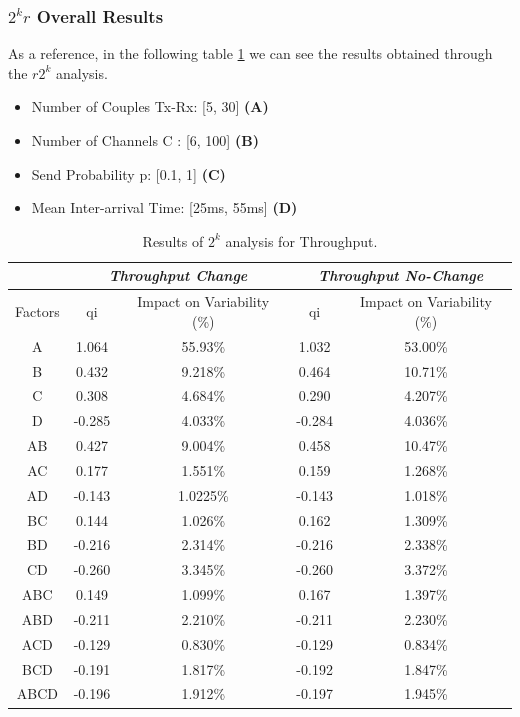\subsubsection{$2^kr$ Overall Results}
As a reference, in the following table \ref{tab: 2kr_results_explosion} we can see the results obtained through the $r2^k$ analysis.

\begin{itemize}
	\item Number of Couples Tx-Rx: [5, 30] \textbf{(A)}
	\item Number of Channels C : [6, 100] \textbf{(B)}
	\item Send Probability p: [0.1, 1] \textbf{(C)}
	\item Mean Inter-arrival Time: [25ms, 55ms] \textbf{(D)}    
\end{itemize}

\begin{table}[H]
	\centering
	\begin{tabular}{|c|c|c|c|c|}
		\hline
		\textbf{} & \multicolumn{2}{c|}{\textit{\textbf{Throughput Change}}} & \multicolumn{2}{c|}{\textit{\textbf{Throughput No-Change}}} \\ \hline
		Factors   & qi          & Impact on Variability (\%)          & qi            & Impact on Variability (\%)           \\ \hline
		A    & 1.064	& 55.93\% 	& 1.032 &	53.00\%  \\ \hline
		B    & 0.432 &	9.218\% &	0.464 &	10.71\%  \\ \hline
		C    & 0.308 & 4.684\% & 0.290 &	4.207\%  \\ \hline
		D    & -0.285 &	4.033\% & -0.284 &	4.036\%  \\ \hline
		AB   & 0.427 & 9.004\% & 0.458 &	10.47\%  \\ \hline
		AC   & 0.177 & 1.551\% & 0.159 &	1.268\%  \\ \hline
		AD   & -0.143 &	1.0225\% & -0.143 & 1.018\%  \\ \hline
		BC   & 0.144 & 1.026\% &	0.162 &	1.309\%  \\ \hline
		BD   & -0.216 &	2.314\% & -0.216 & 2.338\%  \\ \hline
		CD   & -0.260 & 3.345\% & -0.260 & 3.372\%  \\ \hline
		ABC  & 0.149 & 	1.099\% & 0.167 & 1.397\%  \\ \hline
		ABD  & -0.211 &	2.210\% & -0.211 & 2.230\%  \\ \hline
		ACD  & -0.129 &	0.830\% & -0.129 & 0.834\%  \\ \hline
		BCD  & -0.191 &	1.817\% & -0.192 & 1.847\%  \\ \hline
		ABCD & -0.196 &	1.912\% & -0.197 & 1.945\%  \\ \hline
	
	\end{tabular}
	\caption{Results of $2^k$ analysis for Throughput.}
	\label{tab: 2kr_results_explosion}
\end{table}

